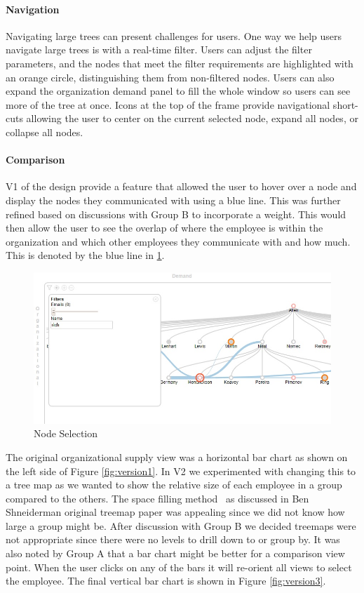 \documentclass[journal]{vgtc}                %
\begin{document}
\paragraph{Navigation}
Navigating large trees can present challenges for users.  One way we help users navigate large trees is with a real-time filter. Users can adjust the filter parameters, and the nodes that meet the filter requirements are highlighted with an orange circle, distinguishing them from non-filtered nodes.  Users can also expand the organization demand panel to fill the whole window so users can see more of the tree at once. Icons at the top of the frame provide navigational short-cuts allowing the user to center on the current selected node, expand all nodes, or collapse all nodes.

\paragraph{Comparison}
V1 of the design provide a feature that allowed the user to hover over a node and display the nodes they communicated with using a blue line.  This was further refined based on discussions with Group B to incorporate a weight.  This would then allow the user to see the overlap of where the employee is within the organization and which other employees they communicate with and how much.  This is denoted by the blue line in \ref{fig:node}.

\begin{figure}
	\centering
	\includegraphics[width=\columnwidth]{pictures/orgdemand.jpg}
	\caption{Node Selection}
	\label{fig:node}
\end{figure}

The original organizational supply view was a horizontal bar chart as shown on the left side of Figure \ref{fig:version1}.  In V2 we experimented with changing this to a tree map as we wanted to show the relative size of each employee in a group compared to the others.  The space filling method~\cite{shneiderman1992tree} as discussed in Ben Shneiderman original treemap paper was appealing since we did not know how large a group might be.  After discussion with Group B we decided treemaps were not appropriate since there were no levels to drill down to or group by.  It was also noted by Group A that a bar chart might be better for a comparison view point.  When the user clicks on any of the bars it will re-orient all views to select the employee.  The final vertical bar chart is shown in Figure \ref{fig:version3}.
\end{document}
